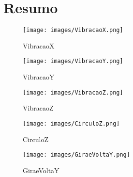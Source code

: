 \section{Resumo}


\begin{figure}[h!]
    \centering
    \label{fig1}
    \texttt{[image: images/VibracaoX.png]}
    \caption{VibracaoX}
\end{figure}

\begin{figure}[h!]
    \centering
    \label{fig2}
    \texttt{[image: images/VibracaoY.png]}
    \caption{VibracaoY}
\end{figure}

\begin{figure}[h!]
    \centering
    \label{fig3}
    \texttt{[image: images/VibracaoZ.png]}
    \caption{VibracaoZ}
\end{figure}

\begin{figure}[h!]
    \centering
    \label{fig4}
    \texttt{[image: images/CirculoZ.png]}
    \caption{CirculoZ}
\end{figure}
\begin{figure}[h!]
    \centering
    \label{fig5}
    \texttt{[image: images/GiraeVoltaY.png]}
    \caption{GiraeVoltaY}
\end{figure}
